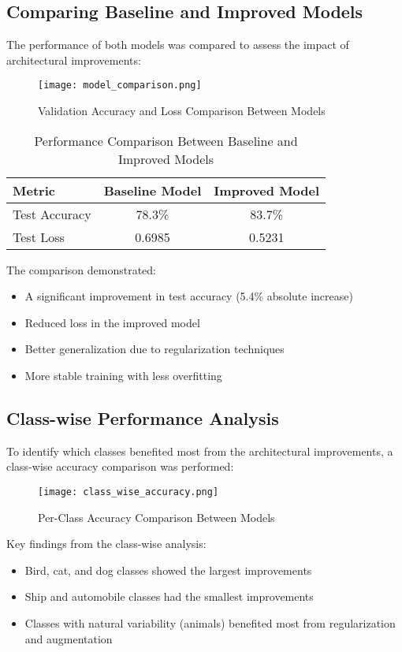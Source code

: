 \documentclass[12pt]{article}
\begin{document}
\subsection{Comparing Baseline and Improved Models}
The performance of both models was compared to assess the impact of architectural improvements:

\begin{figure}[h]
    \centering
    \texttt{[image: model\_comparison.png]}
    \caption{Validation Accuracy and Loss Comparison Between Models}
\end{figure}

\begin{table}[h]
\centering
\begin{tabular}{|l|c|c|}
\hline
\textbf{Metric} & \textbf{Baseline Model} & \textbf{Improved Model} \\
\hline
Test Accuracy & 78.3\% & 83.7\% \\
\hline
Test Loss & 0.6985 & 0.5231 \\
\hline
\end{tabular}
\caption{Performance Comparison Between Baseline and Improved Models}
\end{table}

The comparison demonstrated:
\begin{itemize}
    \item A significant improvement in test accuracy (5.4\% absolute increase)
    \item Reduced loss in the improved model
    \item Better generalization due to regularization techniques
    \item More stable training with less overfitting
\end{itemize}

\subsection{Class-wise Performance Analysis}
To identify which classes benefited most from the architectural improvements, a class-wise accuracy comparison was performed:

\begin{figure}[h]
    \centering
    \texttt{[image: class\_wise\_accuracy.png]}
    \caption{Per-Class Accuracy Comparison Between Models}
\end{figure}

Key findings from the class-wise analysis:
\begin{itemize}
    \item Bird, cat, and dog classes showed the largest improvements
    \item Ship and automobile classes had the smallest improvements
    \item Classes with natural variability (animals) benefited most from regularization and augmentation
\end{itemize}
\end{document}
